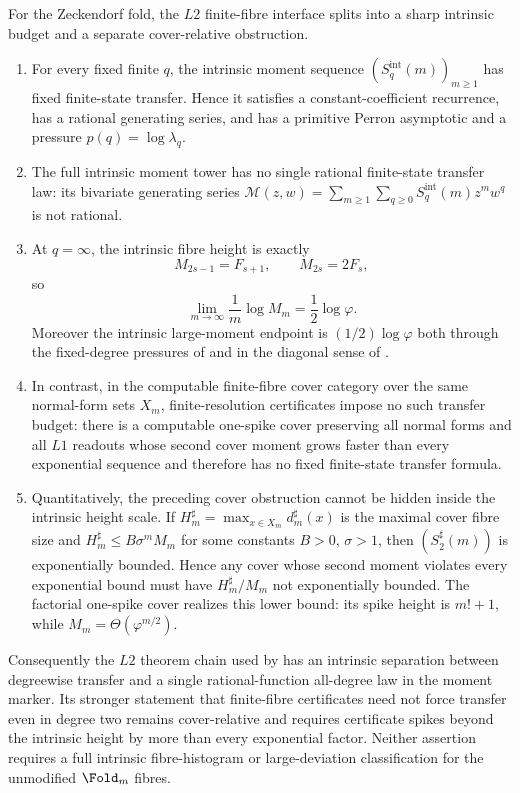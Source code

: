 \begin{theorem}
\label{thm:moment-height-cover-trichotomy}
\label{thm:intrinsic-cover-transfer-budget-dichotomy}
For the Zeckendorf fold, the \(L2\) finite-fibre interface splits into a sharp
intrinsic budget and a separate cover-relative obstruction.
\begin{enumerate}
\item For every fixed finite \(q\), the intrinsic moment sequence
  \((S_q^{\mathrm{int}}(m))_{m\ge1}\) has fixed finite-state transfer.  Hence it
  satisfies a constant-coefficient recurrence, has a rational generating series,
  and has a primitive Perron asymptotic and a pressure
  \(p(q)=\log\lambda_q\).
\item The full intrinsic moment tower has no single rational finite-state
  transfer law: its bivariate generating series
  \(\mathcal M(z,w)=\sum_{m\ge1}\sum_{q\ge0}
  S_q^{\mathrm{int}}(m)z^mw^q\) is not rational.
\item At \(q=\infty\), the intrinsic fibre height is exactly
  \[
    M_{2s-1}=F_{s+1},\qquad M_{2s}=2F_s,
  \]
  so
  \[
    \lim_{m\to\infty}{\frac1m}\log M_m={\frac12}\log\varphi .
  \]
  Moreover the intrinsic large-moment endpoint is
  \((1/2)\log\varphi\) both through the fixed-degree pressures of
   and in the diagonal sense of
  .
\item In contrast, in the computable finite-fibre cover category over the same
  normal-form sets \(X_m\), finite-resolution certificates impose no such
  transfer budget: there is a computable one-spike cover preserving all normal
  forms and all \(L1\) readouts whose second cover moment grows faster than every
  exponential sequence and therefore has no fixed finite-state transfer formula.
\item Quantitatively, the preceding cover obstruction cannot be hidden inside the
  intrinsic height scale.  If
  \(H_m^\sharp=\max_{x\in X_m}d_m^\sharp(x)\) is the maximal cover fibre size and
  \(H_m^\sharp\le B\sigma^m M_m\) for some constants \(B>0\), \(\sigma>1\), then
  \((S_2^\sharp(m))\) is exponentially bounded.  Hence any cover whose second
  moment violates every exponential bound must have
  \(H_m^\sharp/M_m\) not exponentially bounded.  The factorial one-spike cover
  realizes this lower bound: its spike height is \(m!+1\), while
  \(M_m=\Theta(\varphi^{m/2})\).
\end{enumerate}
Consequently the \(L2\) theorem chain used by  has an
intrinsic separation between degreewise transfer and a single rational-function
all-degree law in the moment marker.  Its stronger statement that finite-fibre
certificates need not force transfer even in degree two remains cover-relative and requires
certificate spikes beyond the intrinsic height by more than every exponential
factor.  Neither assertion requires a full intrinsic fibre-histogram or
large-deviation classification for the unmodified \(\Fold_m\) fibres.
\end{theorem}


